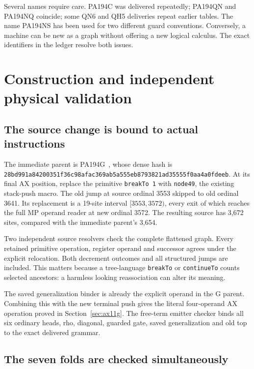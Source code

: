 \documentclass[11pt,letterpaper]{article}
\newcommand{\file}[1]{\texttt{\nolinkurl{#1}}}
\begin{document}
Several names require care. PA194C was delivered repeatedly; PA194QN and
PA194NQ coincide; some QN6 and QH5 deliveries repeat earlier tables.
The name PA194NS has been used for two different guard conventions.
Conversely, a machine can be new as a graph without offering a new
logical calculus. The exact identifiers in the ledger resolve both issues.

\section{Construction and independent physical validation}
\label{sec:physical}

\subsection{The source change is bound to actual instructions}

The immediate parent is PA194G~\cite{g-packet}, whose dense hash is
\nolinkurl{28bd991a84200351f36c98afac369ab5a555eb8793821ad35555f0aa4a0fdeeb}.
At its final AX position, replace the primitive \file{breakTo 1} with
\file{node49}, the existing stack-push macro. The old jump at source
ordinal 3553 skipped to old ordinal 3641. Its replacement is a 19-site
interval $[3553,3572)$, every exit of which reaches the full MP operand
reader at new ordinal 3572. The resulting source has 3,672 sites, compared
with the immediate parent's 3,654.

Two independent source resolvers check the complete flattened graph.
Every retained primitive operation, register operand and successor
agrees under the explicit relocation. Both decrement outcomes and all
structured jumps are included. This matters because a tree-language
\file{breakTo} or \file{continueTo} counts selected ancestors: a harmless
looking reassociation can alter its meaning.

The saved generalization binder is already the explicit operand in the
G parent. Combining this with the new terminal push gives the literal
four-operand AX operation proved in Section~\ref{sec:ax11g}. The free-term
emitter checker binds all six ordinary heads, rho, diagonal, guarded gate,
saved generalization and old top to the exact delivered grammar.

\subsection{The seven folds are checked simultaneously}
\end{document}
